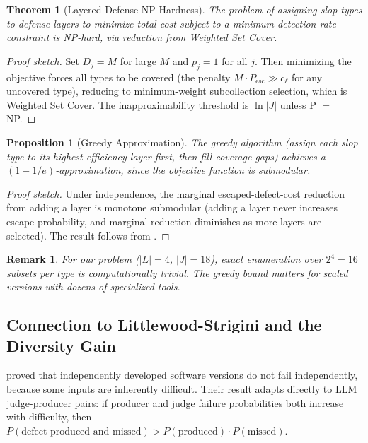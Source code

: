 \documentclass[11pt, a4paper]{googledeepmind}
\newtheorem{theorem}{Theorem}[section]
\newtheorem{proposition}{Proposition}[section]
\newtheorem*{remark}{Remark}
\begin{document}
\begin{theorem}[Layered Defense NP-Hardness]
\label{thm:defense-nphard}
The problem of assigning slop types to defense layers to minimize total cost subject to a minimum detection rate constraint is NP-hard, via reduction from Weighted Set Cover.
\end{theorem}

\begin{proof}[Proof sketch]
Set $D_j = M$ for large $M$ and $p_j = 1$ for all $j$. Then minimizing the objective forces all types to be covered (the penalty $M \cdot P_{\mathrm{esc}} \gg c_\ell$ for any uncovered type), reducing to minimum-weight subcollection selection, which is Weighted Set Cover. The inapproximability threshold is $\ln |J|$ unless P $=$ NP.
\end{proof}

\begin{proposition}[Greedy Approximation]
\label{prop:greedy-defense}
The greedy algorithm (assign each slop type to its highest-efficiency layer first, then fill coverage gaps) achieves a $(1-1/e)$-approximation, since the objective function is submodular.
\end{proposition}

\begin{proof}[Proof sketch]
Under independence, the marginal escaped-defect-cost reduction from adding a layer is monotone submodular (adding a layer never increases escape probability, and marginal reduction diminishes as more layers are selected). The result follows from \citet{nemhauser1978}.
\end{proof}

\begin{remark}
For our problem ($|L| = 4$, $|J| = 18$), exact enumeration over $2^4 = 16$ subsets per type is computationally trivial. The greedy bound matters for scaled versions with dozens of specialized tools.
\end{remark}

\subsection{Connection to Littlewood-Strigini and the Diversity Gain}

\citet{littlewood1993, littlewood2000} proved that independently developed software versions do not fail independently, because some inputs are inherently difficult. Their result adapts directly to LLM judge-producer pairs: if producer and judge failure probabilities both increase with difficulty, then $P(\text{defect produced and missed}) > P(\text{produced}) \cdot P(\text{missed})$.
\end{document}
